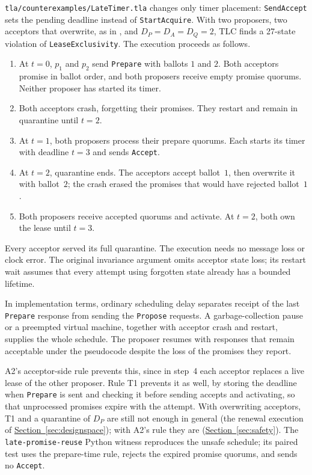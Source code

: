 \documentclass[final,5p,times,twocolumn,number]{elsarticle}
\newcommand{\code}[1]{\texttt{#1}}
\newcommand{\secref}[1]{\hyperref[#1]{Section~\ref*{#1}}}
\begin{document}
\code{tla/counterexamples/LateTimer.tla} changes only timer placement: \code{SendAccept} sets the pending deadline instead of \code{StartAcquire}.  With two proposers, two acceptors that overwrite, as in \cite{ref1}, and $D_P = D_A = D_Q = 2$, TLC finds a 27-state violation of \code{LeaseExclusivity}.  The execution proceeds as follows.

\begin{enumerate}
\itemsep0.15em
\item At $t=0$, $p_1$ and $p_2$ send \code{Prepare} with ballots $1$ and $2$.  Both acceptors promise in ballot order, and both proposers receive empty promise quorums.  Neither proposer has started its timer.
\item Both acceptors crash, forgetting their promises.  They restart and remain in quarantine until $t=2$.
\item At $t=1$, both proposers process their prepare quorums.  Each starts its timer with deadline $t=3$ and sends \code{Accept}.
\item At $t=2$, quarantine ends.  The acceptors accept ballot~$1$, then overwrite it with ballot~$2$; the crash erased the promises that would have rejected ballot~$1$.
\item Both proposers receive accepted quorums and activate.  At $t=2$, both own the lease until $t=3$.
\end{enumerate}

Every acceptor served its full quarantine.  The execution needs no message loss or clock error.  The original invariance argument omits acceptor state loss; its restart wait assumes that every attempt using forgotten state already has a bounded lifetime.

In implementation terms, ordinary scheduling delay separates receipt of the last \code{Prepare} response from sending the \code{Propose} requests.  A garbage-collection pause or a preempted virtual machine, together with acceptor crash and restart, supplies the whole schedule.  The proposer resumes with responses that remain acceptable under the pseudocode despite the loss of the promises they report.

A2's acceptor-side rule prevents this, since in step~4 each acceptor replaces a live lease of the other proposer.  Rule T1 prevents it as well, by storing the deadline when \code{Prepare} is sent and checking it before sending accepts and activating, so that unprocessed promises expire with the attempt.  With overwriting acceptors, T1 and a quarantine of $D_P$ are still not enough in general (the renewal execution of \secref{sec:designspace}); with A2's rule they are (\secref{sec:safety}).  The \code{late-promise-reuse} Python witness reproduces the unsafe schedule; its paired test uses the prepare-time rule, rejects the expired promise quorums, and sends no \code{Accept}.
\end{document}
